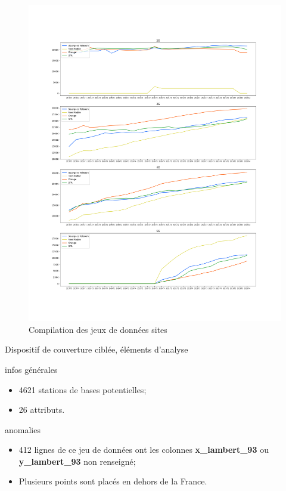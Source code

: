 \begin{frame}{}
    \begin{figure}
        \includegraphics[height=0.8\paperheight]{images/technos-evolution.png}
        \caption{\label{fig:techno-ev}Compilation des jeux de données sites}
    \end{figure}
\end{frame}

\begin{frame}{Dispositif de couverture ciblée, éléments d'analyse}
    \begin{block}{infos générales}
        \begin{itemize}
            \item 4621 stations de bases potentielles;
            \item 26 attributs.
        \end{itemize}
    \end{block}

    \begin{block}{anomalies}
        \begin{itemize}
            \item 412 lignes de ce jeu de données ont les colonnes \textbf{x\_lambert\_93} ou \textbf{y\_lambert\_93} non renseigné;
            \item Plusieurs points sont placés en dehors de la France.
        \end{itemize}
    \end{block}
\end{frame}


